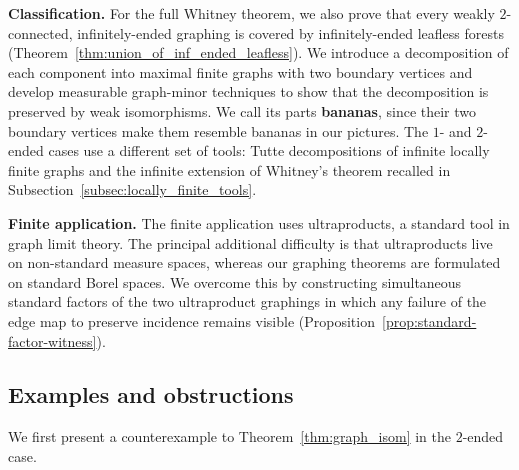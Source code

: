 \documentclass{article}
\theoremstyle{plain}
\theoremstyle{definition}
\begin{document}
\vspace{0.3cm}
\noindent
{\bf Classification.}
For the full Whitney theorem, we also prove that every weakly $2$-connected, infinitely-ended graphing is covered by infinitely-ended leafless forests (Theorem~\ref{thm:union_of_inf_ended_leafless}). We introduce a decomposition of each component into maximal finite graphs with two boundary vertices and develop measurable graph-minor techniques to show that the decomposition is preserved by weak isomorphisms. We call its parts \textbf{bananas}, since their two boundary vertices make them resemble bananas in our pictures. The $1$- and $2$-ended cases use a different set of tools: Tutte decompositions of infinite locally finite graphs and the infinite extension of Whitney's theorem recalled in Subsection~\ref{subsec:locally_finite_tools}.

\vspace{0.3cm}
\noindent
{\bf Finite application.}
The finite application uses ultraproducts, a standard tool in graph limit theory. The principal additional difficulty is that ultraproducts live on non-standard measure spaces, whereas our graphing theorems are formulated on standard Borel spaces. We overcome this by constructing simultaneous standard factors of the two ultraproduct graphings in which any failure of the edge map to preserve incidence remains visible (Proposition~\ref{prop:standard-factor-witness}).

\subsection{Examples and obstructions}\label{subsec:examples}
\hfill

We first present a counterexample to Theorem~\ref{thm:graph_isom} in the $2$-ended case.
\end{document}
